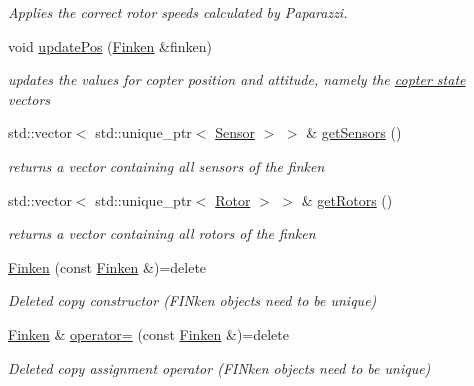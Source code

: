 \begin{DoxyCompactItemize}
\begin{DoxyCompactList}\small\item\em Applies the correct rotor speeds calculated by Paparazzi. \end{DoxyCompactList}\item 
void \hyperlink{classFinken_afddc56af42f000ff17c4a00779b4ad6a}{update\+Pos} (\hyperlink{classFinken}{Finken} \&finken)
\begin{DoxyCompactList}\small\item\em updates the values for copter position and attitude, namely the \hyperlink{classFinken_copterstate}{copter state} vectors \end{DoxyCompactList}\item 
std\+::vector$<$ std\+::unique\+\_\+ptr$<$ \hyperlink{classSensor}{Sensor} $>$ $>$ \& \hyperlink{classFinken_a1215883fb6df7c4853e498dec43b4e6a}{get\+Sensors} ()
\begin{DoxyCompactList}\small\item\em returns a vector containing all sensors of the finken \end{DoxyCompactList}\item 
std\+::vector$<$ std\+::unique\+\_\+ptr$<$ \hyperlink{classRotor}{Rotor} $>$ $>$ \& \hyperlink{classFinken_a610ce496f1c5f2ca22850ee26c54510c}{get\+Rotors} ()
\begin{DoxyCompactList}\small\item\em returns a vector containing all rotors of the finken \end{DoxyCompactList}\item 
\hyperlink{classFinken_a58656dbd7da2521df8bdf63d048cbd42}{Finken} (const \hyperlink{classFinken}{Finken} \&)=delete
\begin{DoxyCompactList}\small\item\em Deleted copy constructor (F\+I\+Nken objects need to be unique) \end{DoxyCompactList}\item 
\hyperlink{classFinken}{Finken} \& \hyperlink{classFinken_a130bd8d16cd7624624db1311c6d5df23}{operator=} (const \hyperlink{classFinken}{Finken} \&)=delete
\begin{DoxyCompactList}\small\item\em Deleted copy assignment operator (F\+I\+Nken objects need to be unique) \end{DoxyCompactList}\end{DoxyCompactItemize}
